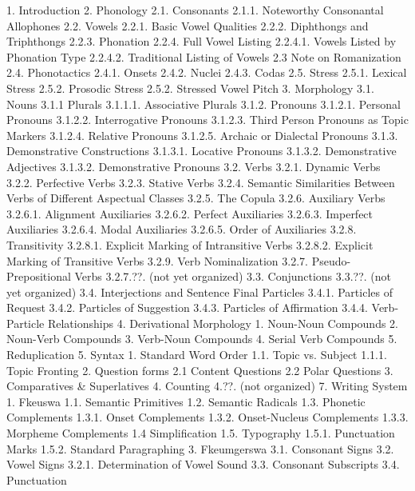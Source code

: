 1. Introduction
2. Phonology
  2.1. Consonants
    2.1.1. Noteworthy Consonantal Allophones
  2.2. Vowels
    2.2.1. Basic Vowel Qualities
    2.2.2. Diphthongs and Triphthongs
    2.2.3. Phonation
    2.2.4. Full Vowel Listing
      2.2.4.1. Vowels Listed by Phonation Type
      2.2.4.2. Traditional Listing of Vowels
  2.3 Note on Romanization
  2.4. Phonotactics
      2.4.1. Onsets
      2.4.2. Nuclei
      2.4.3. Codas
  2.5. Stress
      2.5.1. Lexical Stress
      2.5.2. Prosodic Stress
      2.5.2. Stressed Vowel Pitch
3. Morphology
  3.1. Nouns
    3.1.1 Plurals
      3.1.1.1. Associative Plurals
    3.1.2. Pronouns
      3.1.2.1. Personal Pronouns
      3.1.2.2. Interrogative Pronouns
      3.1.2.3. Third Person Pronouns as Topic Markers
      3.1.2.4. Relative Pronouns
      3.1.2.5. Archaic or Dialectal Pronouns
    3.1.3. Demonstrative Constructions
      3.1.3.1. Locative Pronouns
      3.1.3.2. Demonstrative Adjectives
      3.1.3.2. Demonstrative Pronouns
  3.2. Verbs
    3.2.1. Dynamic Verbs
    3.2.2. Perfective Verbs
    3.2.3. Stative Verbs
    3.2.4. Semantic Similarities Between Verbs of Different Aspectual Classes
    3.2.5. The Copula
    3.2.6. Auxiliary Verbs
      3.2.6.1. Alignment Auxiliaries
      3.2.6.2. Perfect Auxiliaries
      3.2.6.3. Imperfect Auxiliaries
      3.2.6.4. Modal Auxiliaries
      3.2.6.5. Order of Auxiliaries	
    3.2.8. Transitivity
      3.2.8.1. Explicit Marking of Intransitive Verbs
      3.2.8.2. Explicit Marking of Transitive Verbs
    3.2.9. Verb Nominalization
    3.2.7. Pseudo-Prepositional Verbs
      3.2.7.??. (not yet organized)
  3.3. Conjunctions
    3.3.??. (not yet organized)
  3.4. Interjections and Sentence Final Particles
    3.4.1. Particles of Request
    3.4.2. Particles of Suggestion
    3.4.3. Particles of Affirmation
    3.4.4. Verb-Particle Relationships
4. Derivational Morphology
  1. Noun-Noun Compounds
  2. Noun-Verb Compounds
  3. Verb-Noun Compounds
  4. Serial Verb Compounds
  5. Reduplication
5. Syntax
1. Standard Word Order
  1.1. Topic vs. Subject
    1.1.1. Topic Fronting
2. Question forms
  2.1 Content Questions
  2.2 Polar Questions
3. Comparatives & Superlatives
4. Counting
  4.??. (not organized)
7.  Writing System
1. Fkeuswa
  1.1. Semantic Primitives
  1.2. Semantic Radicals
  1.3. Phonetic Complements
  1.3.1. Onset Complements
  1.3.2. Onset-Nucleus Complements
  1.3.3. Morpheme Complements
  1.4 Simplification
  1.5. Typography
    1.5.1. Punctuation Marks
    1.5.2. Standard Paragraphing
3. Fkeumgerswa
  3.1. Consonant Signs
  3.2. Vowel Signs
    3.2.1. Determination of Vowel Sound
  3.3. Consonant Subscripts
  3.4. Punctuation





